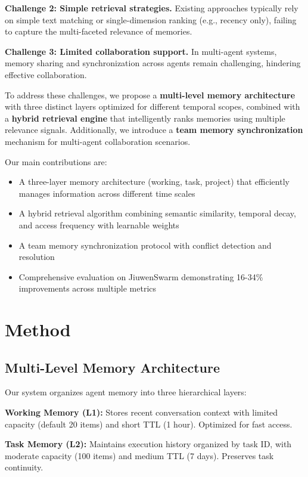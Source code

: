 \documentclass{article} %
\begin{document}
\textbf{Challenge 2: Simple retrieval strategies.} Existing approaches typically
rely on simple text matching or single-dimension ranking (e.g., recency only),
failing to capture the multi-faceted relevance of memories.

\textbf{Challenge 3: Limited collaboration support.} In multi-agent systems,
memory sharing and synchronization across agents remain challenging, hindering
effective collaboration.

To address these challenges, we propose a \textbf{multi-level memory architecture}
with three distinct layers optimized for different temporal scopes, combined with
a \textbf{hybrid retrieval engine} that intelligently ranks memories using multiple
relevance signals. Additionally, we introduce a \textbf{team memory synchronization}
mechanism for multi-agent collaboration scenarios.

Our main contributions are:

\begin{itemize}
\item A three-layer memory architecture (working, task, project) that efficiently
manages information across different time scales
\item A hybrid retrieval algorithm combining semantic similarity, temporal decay,
and access frequency with learnable weights
\item A team memory synchronization protocol with conflict detection and resolution
\item Comprehensive evaluation on JiuwenSwarm demonstrating 16-34\% improvements
across multiple metrics
\end{itemize}



\section{Method}

\subsection{Multi-Level Memory Architecture}

Our system organizes agent memory into three hierarchical layers:

\textbf{Working Memory (L1):} Stores recent conversation context with limited
capacity (default 20 items) and short TTL (1 hour). Optimized for fast access.

\textbf{Task Memory (L2):} Maintains execution history organized by task ID,
with moderate capacity (100 items) and medium TTL (7 days). Preserves task
continuity.
\end{document}
